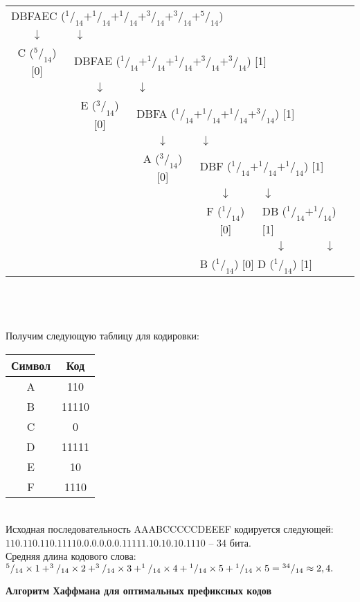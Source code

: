 \begin{table}[h]
\centering
\begin{tabular}{c c c c c c}
\multicolumn{6}{l}{DBFAEC ($^1/_{14} + ^1/_{14} + ^1/_{14} + ^3/_{14} + ^3/_{14} + ^5/_{14}$)} \\
$\downarrow$ & \multicolumn{5}{l}{$\downarrow$} \\
C ($^5/_{14}$) [0] & \multicolumn{5}{l}{DBFAE ($^1/_{14} + ^1/_{14} + ^1/_{14} + ^3/_{14} + ^3/_{14}$) [1]} \\
& $\downarrow$ & \multicolumn{4}{l}{$\downarrow$} \\
& E ($^3/_{14}$) [0] & \multicolumn{4}{l}{DBFA ($^1/_{14} + ^1/_{14} + ^1/_{14} + ^3/_{14}$) [1]} \\
& & $\downarrow$ & \multicolumn{3}{l}{$\downarrow$} \\
& & A ($^3/_{14}$) [0] & \multicolumn{3}{l}{DBF ($^1/_{14} + ^1/_{14} + ^1/_{14}$) [1]} \\
& & & $\downarrow$ & \multicolumn{2}{l}{$\downarrow$} \\
& & & F ($^1/_{14}$) [0] & \multicolumn{2}{l}{DB ($^1/_{14} + ^1/_{14}$) [1]} \\
& & & & $\downarrow$ & \multicolumn{1}{c}{$\downarrow$} \\
& & & \multicolumn{3}{l}{\qquad B ($^1/_{14}$) [0] \qquad D ($^1/_{14}$) [1]}\\
\end{tabular}
\end{table}
\\
\\
\\Получим следующую таблицу для кодировки:
\\
\begin{table}[h]
\begin{tabular}{|c|c|}
\hline
Символ &  Код \\
\hline
A & 110 \\
B & 11110 \\
C & 0 \\
D & 11111 \\
E & 10 \\
F & 1110 \\
\hline
\end{tabular}
\end{table}
\\Исходная последовательность AAABCCCCCDEEEF кодируется следующей: $110.110.110.11110.0.0.0.0.0.11111.10.10.10.1110$ -- 34 бита.
\\Средняя длина кодового слова: $^5/_{14}\times 1 + ^3/_{14}\times 2 + ^3/_{14}\times 3 + ^1/_{14}\times 4\hm + ^1/_{14}\hm\times 5\hm + ^1/_{14}\hm\times 5\hm = ^{34}/_{14} \approx 2,4.$
\begin{center}
  \textbf{Алгоритм Хаффмана для оптимальных префиксных кодов}
\end{center}

